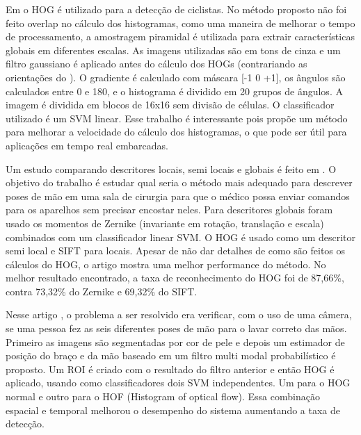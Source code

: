 Em \cite{li2010effective} o HOG é utilizado para a detecção de ciclistas. No método proposto não foi feito overlap no cálculo dos histogramas, como uma maneira de melhorar o tempo de processamento, a amostragem piramidal é utilizada para extrair características globais em diferentes escalas. As imagens utilizadas são em tons de cinza e um filtro gaussiano é aplicado antes do cálculo dos HOGs (contrariando as orientações do ). O gradiente é calculado com máscara [-1 0 +1], os ângulos são calculados entre 0 e 180, e o histograma é dividido em 20 grupos de ângulos. A imagem é dividida em blocos de 16x16 sem divisão de células. O classificador utilizado é um SVM linear. Esse trabalho é interessante pois propõe um método para melhorar a velocidade do cálculo dos histogramas, o que pode ser útil para aplicações em tempo real embarcadas.

Um estudo comparando descritores locais, semi locais e globais é feito em \cite{collumeau2011hand}. O objetivo do trabalho é estudar qual seria o método mais adequado para descrever poses de mão em uma sala de cirurgia para que o médico possa enviar comandos para os aparelhos sem precisar encostar neles. Para descritores globais foram usado os momentos de Zernike (invariante em rotação, translação e escala) combinados com um classificador linear SVM. O HOG é usado como um descritor semi local e SIFT para locais. Apesar de não dar detalhes de como são feitos os cálculos do HOG, o artigo mostra uma melhor performance do método. No melhor resultado encontrado, a taxa de reconhecimento do HOG foi de 87,66\%, contra 73,32\% do Zernike e 69,32\% do SIFT.

Nesse artigo \cite{llorca2011vision}, o problema a ser resolvido era verificar, com o uso de uma câmera, se uma pessoa  fez as seis diferentes poses de mão para o lavar correto das mãos. Primeiro as imagens são segmentadas por cor de pele e depois um estimador de posição do braço e da mão baseado em um filtro multi modal probabilístico é proposto. Um ROI é criado com o resultado do filtro anterior e então HOG é aplicado, usando como classificadores dois SVM independentes. Um para o HOG normal e outro para o HOF (Histogram of optical flow). Essa combinação espacial e temporal melhorou o desempenho do sistema aumentando a taxa de detecção.

